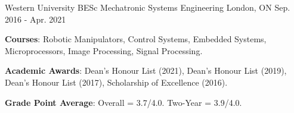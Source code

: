 

\begin{cventries}

  \cventry
    {Western University} %
    {BESc Mechatronic Systems Engineering} %
    {London, ON} %
    {Sep. 2016 - Apr. 2021} %
    {
      \begin{cvitems} %
        \item {\textbf{Courses}: Robotic Manipulators, Control Systems, Embedded Systems, Microprocessors, Image Processing, Signal Processing.}
        \item {\textbf{Academic Awards}: Dean's Honour List (2021), Dean's Honour List (2019), Dean's Honour List (2017), Scholarship of Excellence (2016).}
        \item {\textbf{Grade Point Average}: Overall = 3.7/4.0. Two-Year = 3.9/4.0.}
      \end{cvitems}
    }

\end{cventries}
